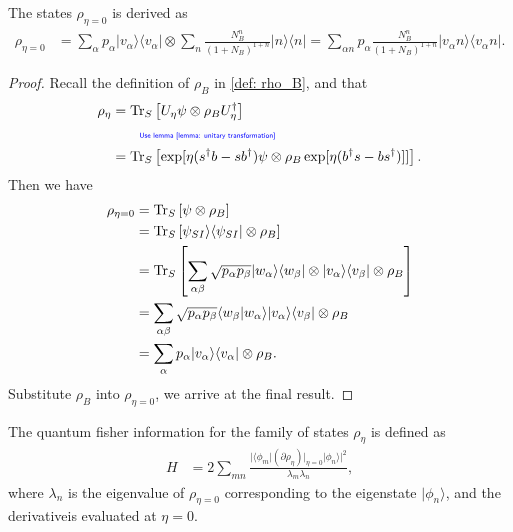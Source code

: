\documentclass[../../note.tex]{subfiles}
\begin{document}
\begin{lemma}[$\rho_{\eta = 0}$]
    The states $\rho_{\eta=0}$ is derived as
    \begin{align}
        \rho_{\eta = 0}
        &= \sum_{\alpha} p_{\alpha} \vert v_{\alpha} \rangle \langle v_{\alpha} \vert \otimes \sum_n \frac{N_B^n}{(1 + N_B)^{1 + n}} \vert n \rangle \langle n \vert = \sum_{\alpha n} p_{\alpha} \frac{N_B^n}{(1+N_B)^{1+n}} \vert v_{\alpha} n \rangle \langle v_{\alpha } n \vert.
    \end{align}
\end{lemma}
\begin{proof}
    Recall the definition of $\rho_B$ in \ref{def: rho_B}, and that 
    \begin{align}
        \rho_{\eta}
        &= \operatorname{Tr}_S\left[U_{\eta} \psi \otimes \rho_B U_{\eta}^\dagger \right] \\
        &\qquad\text{\color{blue}{\tiny\sffamily Use lemma \ref{lemma: unitary transformation}}} \nonumber \\
        &= \operatorname{Tr}_S\left[\exp[\eta (s^\dagger b -s b^{\dagger}) \psi \otimes \rho_B \exp[\eta(b^\dagger s - b s^\dagger)]] \right].
    \end{align}
    Then we have
    \begin{align}
        \rho_{\eta = 0}
        &= \operatorname{Tr}_S\left[\psi \otimes \rho_B \right]  \\
        &= \operatorname{Tr}_S\left[\psi_{SI} \rangle \langle \psi_{SI} \vert \otimes \rho_B \right] \\
        &= \operatorname{Tr}_S\left[\sum_{\alpha \beta} \sqrt{p_{\alpha} p_{\beta}} \vert w_{\alpha} \rangle \langle w_{\beta} \vert \otimes \vert v_{\alpha} \rangle \langle v_{\beta} \vert \otimes \rho_B \right] \\
        &= \sum_{\alpha \beta} \sqrt{p_{\alpha} p_{\beta}} \langle w_{\beta} \vert w_{\alpha} \rangle \vert v_{\alpha}\rangle \langle v_{\beta} \vert \otimes \rho_B \\
        &= \sum_{\alpha} p_{\alpha} \vert v_{\alpha} \rangle \langle v_{\alpha} \vert \otimes \rho_B.
    \end{align}
    Substitute $\rho_B$ into $\rho_{\eta=0}$, we arrive at the final result.
\end{proof}

\begin{definition}
    The quantum fisher information for the family of states $\rho_{\eta}$ is defined as
    \begin{align}
        H
        &= 2 \sum_{mn} \frac{\vert \langle \phi_m \vert (\partial \rho_{\eta})\vert_{\eta = 0} \vert \phi_n \rangle \vert^2}{\lambda_m \lambda_n},
    \end{align}
    where $\lambda_n$ is the eigenvalue of $\rho_{\eta = 0}$ corresponding to the eigenstate $\vert \phi_n \rangle$, and the derivativeis evaluated at $\eta = 0$.
\end{definition}
\end{document}
